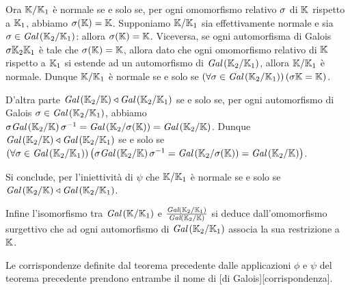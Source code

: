 \par Ora $\mathbb{K}/\mathbb{K}_1$ \`e normale se e solo se, per ogni omomorfismo relativo $\sigma$ di $\mathbb{K}$ rispetto a $\mathbb{K}_1$, abbiamo $\sigma(\mathbb{K}) = \mathbb{K}$.  Supponiamo $\mathbb{K}/\mathbb{K}_1$ sia effettivamente normale e sia $\sigma \in \textit{Gal} \left ( \mathbb{K}_2/\mathbb{K}_1 \right )$: allora $\sigma(\mathbb{K}) = \mathbb{K}$. Viceversa, se ogni automorfisma di Galois $\sigma{\mathbb{K}_2}{\mathbb{K}_1}$ \`e tale che $\sigma(\mathbb{K}) = \mathbb{K}$, allora dato che ogni omomorfismo relativo di $\mathbb{K}$ rispetto a $\mathbb{K}_1$ si estende ad un automorfismo di $\textit{Gal} \left ( \mathbb{K}_2/\mathbb{K}_1 \right )$, allora $\mathbb{K}/\mathbb{K}_1$ \`e normale. Dunque $\mathbb{K}/\mathbb{K}_1$ \`e normale se e solo se $\left ( \forall \sigma \in \textit{Gal} \left ( \mathbb{K}_2/\mathbb{K}_1 \right ) \right ) \left ( \sigma{\mathbb{K}} = \mathbb{K} \right )$.
\par D'altra parte $\textit{Gal} \left ( \mathbb{K}_2/\mathbb{K} \right ) \triangleleft \textit{Gal} \left ( \mathbb{K}_2/\mathbb{K}_1 \right )$ se e solo se, per ogni automorfismo di Galois $\sigma \in \textit{Gal} \left ( \mathbb{K}_2/\mathbb{K}_1 \right )$, abbiamo $\sigma\textit{Gal} \left ( \mathbb{K}_2/\mathbb{K} \right )\sigma^{-1} = \textit{Gal} \left ( \mathbb{K}_2/\sigma(\mathbb{K}) \right ) = \textit{Gal} \left ( \mathbb{K}_2/\mathbb{K} \right )$. Dunque $\textit{Gal} \left ( \mathbb{K}_2/\mathbb{K} \right ) \triangleleft \textit{Gal} \left ( \mathbb{K}_2/\mathbb{K}_1 \right )$ se e solo se $\left ( \forall \sigma \in \textit{Gal} \left ( \mathbb{K}_2/\mathbb{K}_1 \right ) \right ) \left ( \sigma\textit{Gal} \left ( \mathbb{K}_2/\mathbb{K} \right )\sigma^{-1} = \textit{Gal} \left ( \mathbb{K}_2/\sigma(\mathbb{K}) \right ) = \textit{Gal} \left ( \mathbb{K}_2/\mathbb{K} \right ) \right )$.
\par Si conclude, per l'iniettivit\`a di $\psi$ che $\mathbb{K}/\mathbb{K}_1$ \`e normale se e solo se $\textit{Gal} \left ( \mathbb{K}_2/\mathbb{K} \right ) \triangleleft \textit{Gal} \left ( \mathbb{K}_2/\mathbb{K}_1 \right )$.
\par Infine l'isomorfismo tra $\textit{Gal} \left ( \mathbb{K}/\mathbb{K}_1 \right )$ e $\frac{\textit{Gal} \left ( \mathbb{K}_2/\mathbb{K}_1 \right )}{\textit{Gal} \left ( \mathbb{K}_2/\mathbb{K} \right )}$ si deduce dall'omomorfismo surgettivo che ad ogni automorfismo di $\textit{Gal} \left ( \mathbb{K}_2/\mathbb{K}_1 \right )$ associa la sua restrizione a $\mathbb{K}$. \EndProof
\begin{Definition}
	Le corrispondenze definite dal teorema precedente dalle applicazioni $\phi$ e $\psi$ del teorema precedente prendono entrambe il nome di [di Galois][corrispondenza].
\end{Definition}
\par
